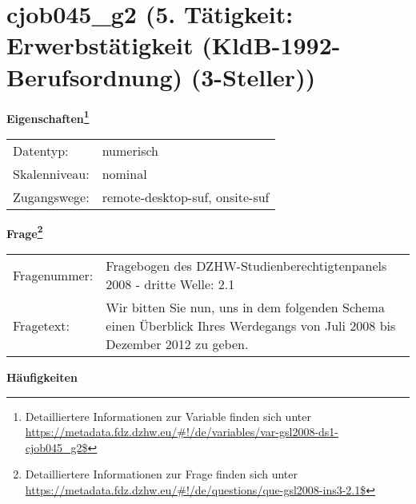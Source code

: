
    \setcounter{footnote}{0}

    \vspace*{-1.8cm}
	\section{cjob045\_g2 (5. Tätigkeit: Erwerbstätigkeit (KldB-1992-Berufsordnung) (3-Steller))}
	\label{section:cjob045_g2}



    \vspace*{0.5cm}
    \noindent\textbf{Eigenschaften\footnote{Detailliertere Informationen zur Variable finden sich unter
		\url{https://metadata.fdz.dzhw.eu/\#!/de/variables/var-gsl2008-ds1-cjob045_g2$}}}\\
	\begin{tabularx}{\hsize}{@{}lX}
	Datentyp: & numerisch \\
	Skalenniveau: & nominal \\
	Zugangswege: &
	  remote-desktop-suf, 
	  onsite-suf
 \\
    \end{tabularx}



				\vspace*{0.5cm}
                \noindent\textbf{Frage\footnote{Detailliertere Informationen zur Frage finden sich unter
		              \url{https://metadata.fdz.dzhw.eu/\#!/de/questions/que-gsl2008-ins3-2.1$}}}\\
				\begin{tabularx}{\hsize}{@{}lX}
					Fragenummer: &
					  Fragebogen des DZHW-Studienberechtigtenpanels 2008 - dritte Welle:
					  2.1
 \\
					Fragetext: & Wir bitten Sie nun, uns in dem folgenden Schema einen Überblick Ihres Werdegangs von Juli 2008 bis Dezember 2012 zu geben. \\
				\end{tabularx}





        		\vspace*{0.5cm}
                \noindent\textbf{Häufigkeiten}

